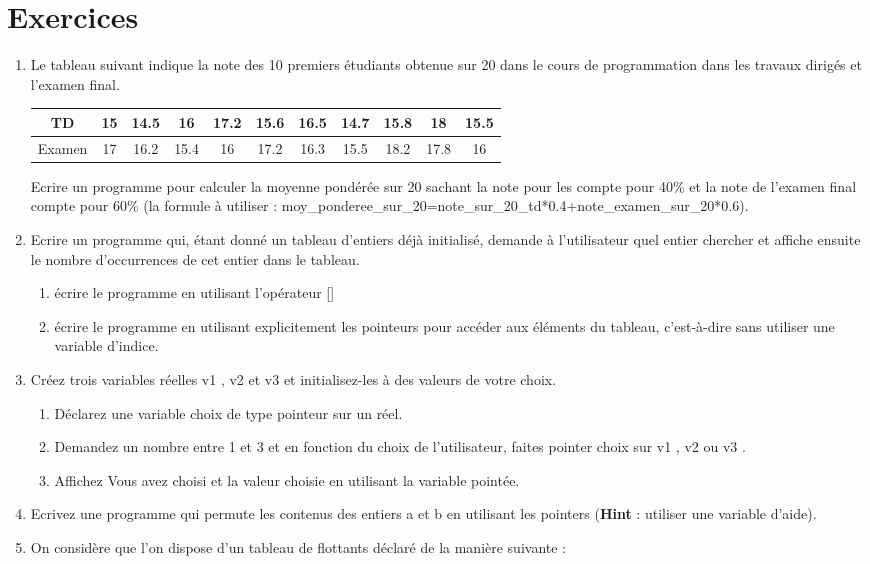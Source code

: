 \documentclass[a4paper, oneside,11pt]{book}
\begin{document}
\section{Exercices}
\begin{enumerate}
\item Le tableau suivant indique la note des 10 premiers \'etudiants obtenue sur 20
dans le cours de programmation dans les travaux dirig\'es et l'examen final.
\begin{table}[hhhh]
\begin{center}
\begin{tabular}{|c|c|c|c|c|c|c|c|c|c|c|}
\hline
TD & 15& 14.5&16 &17.2 & 15.6& 16.5& 14.7&15.8 & 18& 15.5\\
\hline
Examen &17 & 16.2& 15.4& 16& 17.2& 16.3& 15.5&18.2 &17.8&16 \\
\hline
\end{tabular}
\end{center}
\end{table}

Ecrire un programme pour calculer la moyenne pond\'er\'ee sur 20 sachant la note pour 
les compte pour 40\% et la note de l'examen final compte pour 60\% (la formule \`a
utiliser : moy\_ponderee\_sur\_20=note\_sur\_20\_td*0.4+note\_examen\_sur\_20*0.6).
\item Ecrire un programme qui, \'etant donn\'e un tableau d’entiers d\'ej\`a
 initialis\'e, demande \`a l’utilisateur quel entier chercher et affiche ensuite le nombre d’occurrences de cet entier
dans le tableau.
\begin{enumerate} 
\item \'ecrire le programme en utilisant l'op\'erateur []
\item \'ecrire le programme en utilisant explicitement les pointeurs pour acc\'eder 
aux \'el\'ements du tableau, c'est-\`a-dire sans utiliser une variable d'indice.
\end{enumerate}
\item Cr\'eez trois variables r\'eelles v1 , v2 et v3 et initialisez-les à des valeurs de votre choix.
\begin{enumerate}
\item D\'eclarez une variable choix de type pointeur sur un r\'eel.
\item Demandez un nombre entre 1 et 3 et en fonction du choix de l'utilisateur, 
faites pointer choix sur v1 , v2 ou v3 .
\item Affichez \og Vous avez choisi \fg et la valeur choisie en utilisant la 
variable point\'ee.
\end{enumerate}
\item Ecrivez une programme qui permute les contenus des entiers a et b en utilisant les pointers (\textbf{Hint} : utiliser une variable d'aide).
\item On consid\`ere que l'on dispose d'un tableau de flottants d\'eclar\'e de la manière suivante :


\end{enumerate}
\end{document}
